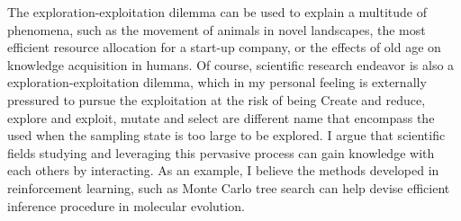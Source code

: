 The exploration-exploitation dilemma can be used to explain a multitude of phenomena, such as the movement of animals in novel landscapes, the most efficient resource allocation for a start-up company, or the effects of old age on knowledge acquisition in humans.
Of course, scientific research endeavor is also a exploration-exploitation dilemma, which in my personal feeling is externally pressured to pursue the exploitation at the risk of being 
Create and reduce, explore and exploit, mutate and select are different name that encompass the used when the sampling state is too large to be explored.
I argue that scientific fields studying and leveraging this pervasive process can gain knowledge with each others by interacting. 
As an example, I believe the methods developed in reinforcement learning, such as Monte Carlo tree search can help devise efficient inference procedure in molecular evolution. 
